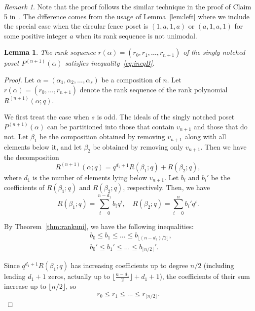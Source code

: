 \documentclass{article}
\newtheorem{lemma}{Lemma}
\theoremstyle{remark}
\newtheorem{remark}{Remark}
\begin{document}
\begin{remark}
Note that the proof follows the similar technique in the proof of Claim 5 in~\cite{OR23}. The difference comes from the usage of Lemma~\ref{lem:left} where we include the special case when the circular fence poset is $(1,a,1,a)$ or $(a,1,a,1)$ for some positive integer $a$ when its rank sequence is not unimodal.
\end{remark}


\begin{lemma}\label{lem:sineqB}
    The rank sequence \( r(\alpha) = (r_{0}, r_{1}, \ldots, r_{n+1}) \) of the singly notched poset \( P^{(n+1)}(\alpha) \) satisfies inequality~\textnormal{\eqref{eq:ineqB}}.
\end{lemma}

\begin{proof}
Let \( \alpha = (\alpha_1, \alpha_2, \ldots, \alpha_s) \) be a composition of \( n \). Let \( r(\alpha) = (r_0, \ldots, r_{n+1}) \) denote the rank sequence of the rank polynomial \( R^{(n+1)}(\alpha; q) \).

We first treat the case when \( s \) is odd. The ideals of the singly notched poset \( P^{(n+1)}(\alpha) \) can be partitioned into those that contain \( v_{n+1} \) and those that do not. Let \( \beta_1 \) be the composition obtained by removing \( v_{n+1} \) along with all elements below it, and let \( \beta_2 \) be obtained by removing only \( v_{n+1} \). Then we have the decomposition
\[
R^{(n+1)}(\alpha; q) = q^{d_1 + 1} R(\beta_1; q) + R(\beta_2; q),
\]
where \( d_1 \) is the number of elements lying below \( v_{n+1} \).
Let \( b_i \) and \( b_i' \) be the coefficients of \( R(\beta_1; q) \) and \( R(\beta_2; q) \), respectively. Then, we have
\[
R(\beta_1; q) = \sum_{i=0}^{n - d_1} b_i q^i, \quad R(\beta_2; q) = \sum_{i=0}^{n} b_i' q^i.
\]


By Theorem~\ref{thm:rankuni}, we have the following inequalities:
\begin{align*}
    &b_0 \le b_1 \le \dots \le b_{\lfloor (n - d_1)/2 \rfloor}, \\
&b_0' \le b_1' \le \dots \le b_{\lfloor n/2 \rfloor}'.
\end{align*}

Since \( q^{d_1 + 1} R(\beta_1; q) \) has increasing coefficients up to degree \( n/2 \) (including leading $d_{1} + 1$ zeros, actually up to \(\lfloor \frac{n - d_1}{2} \rfloor + d_1 + 1\)), the coefficients of their sum increase up to \( \lfloor n/2 \rfloor \), so
\[
r_0 \le r_1 \le \dots \le r_{\lfloor n/2 \rfloor}.
\]


\end{proof}
\end{document}
